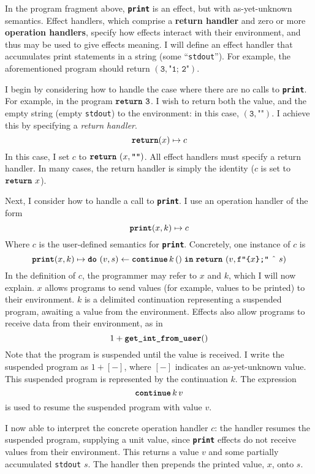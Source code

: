 In the program fragment above, \textbf{\texttt{print}} is an effect, but with as-yet-unknown semantics. Effect handlers, which comprise a \textbf{return handler} and zero or more \textbf{operation handlers}, specify how effects interact with their environment, and thus may be used to give effects meaning. I will define an effect handler that accumulates print statements in a string (some ``\texttt{stdout}'').  For example, the aforementioned program should return $(\texttt{3}, \texttt{"1; 2"})$.

I begin by considering how to handle the case where there are no calls to \textbf{\texttt{print}}. For example, in the program $\texttt{\textbf{return}} \,\, {\texttt{3}}$. I wish to return both the value, and the empty string (empty \texttt{stdout}) to the environment: in this case, $(\texttt{3}, \texttt{""})$. I achieve this by specifying a \textit{return handler}.
\[\textbf{\texttt{return}}(x) \mapsto {c}\]
In this case, I set $c$ to $\texttt{\textbf{return}} \,\, {(x, \texttt{""})}$. All effect handlers must specify a return handler. In many cases, the return handler is simply the identity ($c$ is set to $\texttt{\textbf{return}} \,\, {x}$). 

Next, I consider how to handle a call to \textbf{\texttt{print}}. I use an operation handler of the form 
\[\textbf{\texttt{print}}(x, k) \mapsto {c}\]
Where $c$ is the user-defined semantics for \textbf{\texttt{print}}.
Concretely, one instance of $c$ is 
\[\textbf{\texttt{print}}(x, k) \mapsto {\texttt{\textbf{do}} \,\, {(v, s)} \leftarrow {\textbf{\texttt{continue}} \, {k} \, {()}} \; \textbf{\texttt{in}} \; {\texttt{\textbf{return}} \,\, {(v, \texttt{f"\{$x$\};"} \text{ \^\ } s)}}}\]
In the definition of $c$, the programmer may refer to $x$ and $k$, which I will now explain. $x$ allows programs to send values (for example, values to be printed) to their environment. $k$ is a delimited continuation representing a suspended program, awaiting a value from the environment. Effects also allow programs to receive data from their environment, as in
\[1 + \textbf{\texttt{get\_int\_from\_user}}()\]
Note that the program is suspended until the value is received. I write the suspended program as $1 + [-]$, where $[-]$ indicates an as-yet-unknown value. This suspended program is represented by the continuation $k$. The expression 
\[\textbf{\texttt{continue}} \, {k} \, {v}\] 
is used to resume the suspended program with value $v$. 

I now able to interpret the concrete operation handler $c$: the handler resumes the suspended program, supplying a unit value, since \textbf{\texttt{print}} effects do not receive values from their environment. This returns a value $v$ and some partially accumulated \texttt{stdout} $s$. The handler then prepends the printed value, $x$, onto $s$. 

